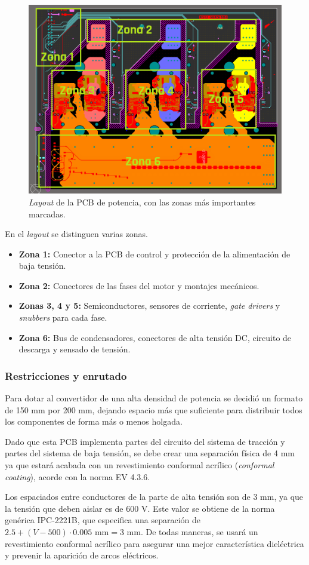 \begin{figure}[H]
	\centering
	\includegraphics[width=0.7\linewidth]{fig/layout}
	\caption{\textit{Layout} de la PCB de potencia, con las zonas más importantes marcadas.}
\end{figure}

En el \textit{layout} se distinguen varias zonas. 
\begin{itemize}
	\item \textbf{Zona 1:} Conector a la PCB de control y protección de la alimentación de baja tensión.
	\item \textbf{Zona 2:} Conectores de las fases del motor y montajes mecánicos.
	\item \textbf{Zonas 3, 4 y 5:} Semiconductores, sensores de corriente, \textit{gate drivers} y \textit{snubbers} para cada fase.
	\item \textbf{Zona 6:} Bus de condensadores, conectores de alta tensión DC, circuito de descarga y sensado de tensión.
\end{itemize}

\subsubsection{Restricciones y enrutado}
Para dotar al convertidor de una alta densidad de potencia se decidió un formato de 150 mm por 200 mm, dejando espacio más que suficiente para distribuir todos los componentes de forma más o menos holgada.

Dado que esta PCB implementa partes del circuito del sistema de tracción y partes del sistema de baja tensión, se debe crear una separación física de 4 mm ya que estará acabada con un revestimiento conformal acrílico (\textit{conformal coating}), acorde con la norma EV 4.3.6.

Los espaciados entre conductores de la parte de alta tensión son de 3 mm, ya que la tensión que deben aislar es de 600 V. Este valor se obtiene de la norma genérica IPC-2221B, que especifica una separación de $2.5+(V-500)\cdot0.005 \text{ mm} = 3 \text{ mm}$. De todas maneras, se usará un revestimiento conformal acrílico para asegurar una mejor característica dieléctrica y prevenir la aparición de arcos eléctricos.

